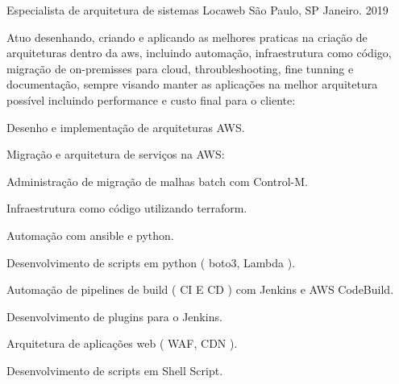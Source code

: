 

\begin{cventries}
  \cventry
    {Especialista de arquitetura de sistemas} %
    {Locaweb} %
    {São Paulo, SP} %
    {Janeiro. 2019} %
    {
      \begin{cvitems} %
       \item {Atuo desenhando, criando e aplicando as melhores praticas na criação de arquiteturas dentro da aws, incluindo automação, infraestrutura como código, migração de on-premisses para cloud, throubleshooting, fine tunning e documentação, sempre visando manter as aplicações na melhor arquitetura possível incluindo performance e custo final para o cliente:}
       \item {Desenho e implementação de arquiteturas AWS.}
       \item {Migração e arquitetura de serviços na AWS:}
       \item {}
       \item {}
       \item {}
       \item {}
       \item {}
       \item {}
       \item {Administração de migração de malhas batch com Control-M.}
       \item {Infraestrutura como código utilizando terraform.}
       \item {Automação com ansible e python.}
       \item {Desenvolvimento de scripts em python ( boto3, Lambda ).}
       \item {Automação de pipelines de build ( CI E CD ) com Jenkins e AWS CodeBuild.}
       \item {Desenvolvimento de plugins para o Jenkins.}
       \item {}
       \item {}
       \item {Arquitetura de aplicações web ( WAF, CDN ).}
       \item {Desenvolvimento de scripts em Shell Script.}
      \end{cvitems}
    }


\end{cventries}
